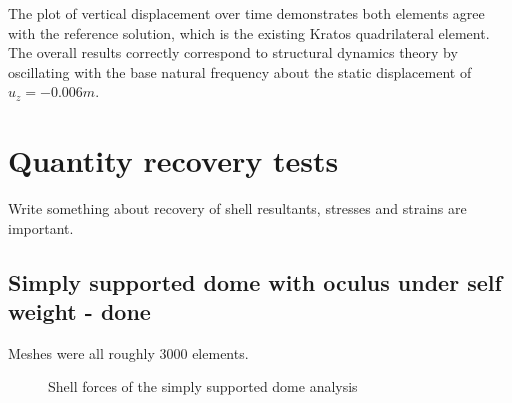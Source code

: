  The plot of vertical displacement over time demonstrates both elements agree with the reference solution, which is the existing Kratos quadrilateral element. The overall results correctly correspond to structural dynamics theory by oscillating with the base natural frequency about the static displacement of $u_z=-0.006m$.

\section{Quantity recovery tests}

Write something about recovery of shell resultants, stresses and strains are important.

\subsection{Simply supported dome with oculus under self weight - done}



Meshes were all roughly 3000 elements.

\begin{figure}[H]
	\caption{\label{Shell_force_dome_benchmark_shell_force}Shell forces of the simply supported dome analysis}
\end{figure}


